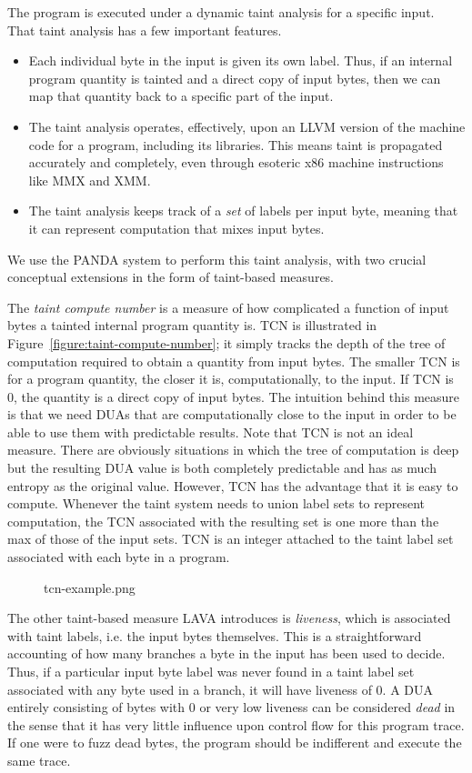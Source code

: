 The program is executed under a dynamic taint analysis for a specific input.
That taint analysis has a few important features.
\begin{itemize}
\item Each individual byte in the input is given its own label.
Thus, if an internal program quantity is tainted and a direct copy of input bytes, then we can map that quantity back to a specific part of the input.  
\item The taint analysis operates, effectively, upon an LLVM version of the machine code for a program, including its libraries.
This means taint is propagated accurately and completely, even through esoteric x86 machine instructions like MMX and XMM.
\item The taint analysis keeps track of a \emph{set} of labels per input byte, meaning that it can represent computation that mixes input bytes.
\end{itemize}
We use the PANDA system to perform this taint analysis, with two crucial conceptual extensions in the form of taint-based measures.

The \emph{taint compute number} is a measure of how complicated a function of input bytes a tainted internal program quantity is.
TCN is illustrated in Figure~\ref{figure:taint-compute-number}; it simply tracks the depth of the tree of computation required to obtain 
a quantity from input bytes.
The smaller TCN is for a program quantity, the closer it is, computationally, to the input.
If TCN is 0, the quantity is a direct copy of input bytes.
The intuition behind this measure is that we need DUAs that are computationally close to the input in order to be able to use them with predictable results.
Note that TCN is not an ideal measure.
There are obviously situations in which the tree of computation is deep but the resulting DUA value is both completely predictable and has as much entropy as the original value.
However, TCN has the advantage that it is easy to compute.
Whenever the taint system needs to union label sets to represent computation, the TCN associated with the resulting set is one more than the max of those of the 
input sets.
TCN is an integer attached to the taint label set associated with each byte in a program.

\begin{figure}

tcn-example.png
\end{figure}

The other taint-based measure LAVA introduces is \emph{liveness}, which is associated with taint labels, i.e. the input bytes themselves.
This is a straightforward accounting of how many branches a byte in the input has been used to decide.
Thus, if a particular input byte label was never found in a taint label set associated with any byte used in a branch, it will have liveness of 0.
A DUA entirely consisting of bytes with 0 or very low liveness can be considered \emph{dead} in the sense that it has very little influence upon control flow for this program trace.
If one were to fuzz dead bytes, the program should be indifferent and execute the same trace.  

